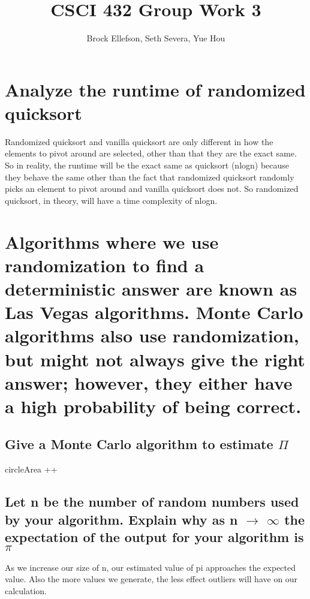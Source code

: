 \documentclass[10pt,letterpaper]{article}
\author{Brock Ellefson, Seth Severa, Yue Hou}
\title{CSCI 432 Group Work 3}
\begin{document}
\maketitle
\section{Analyze the runtime of randomized quicksort}
Randomized quicksort and vanilla quicksort are only different in how the elements to pivot around are selected, other than that they are the exact same. So in reality, the runtime will be the exact same as quicksort (nlogn) because they behave the same other than the fact that randomized quicksort randomly picks an element to pivot around and vanilla quicksort does not. So randomized quicksort, in theory, will have a time complexity of nlogn.

\section{Algorithms where we use randomization
to find a deterministic answer are known as Las Vegas algorithms. Monte Carlo algorithms
also use randomization, but might not always give the
right answer; however, they either have a high probability
of being correct.}

\subsection{Give a Monte Carlo algorithm to estimate $\Pi$}

\begin{algorithmic}
		\STATE circleArea ++
	\ENDIF
\ENDFOR
{}		
\end{algorithmic}


\subsection{Let n be the number of random numbers used by your algorithm. Explain why as n $\rightarrow$ $\infty$ the expectation of the output for your algorithm is $\pi$}
As we increase our size of n, our estimated value of pi approaches the expected value. Also the more values we generate, the less effect outliers will have on our calculation.
\end{document}

